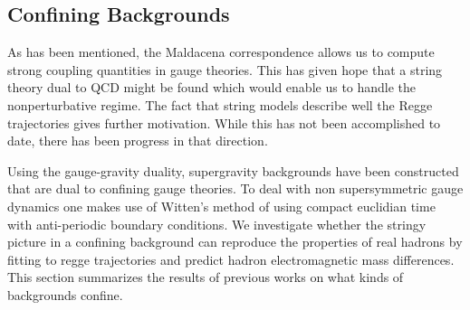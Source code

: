 \documentclass[11pt,a4paper]{article}
\begin{document}
\FloatBarrier
\subsection{Confining Backgrounds}
As has been mentioned, the Maldacena correspondence allows us to compute strong coupling quantities in gauge theories. This has given hope that a string theory dual to QCD might be found which would enable us to handle the nonperturbative regime. The fact that string models describe well the Regge trajectories gives further motivation. While this has not been accomplished to date, there has been progress in that direction.

Using the gauge-gravity duality, supergravity backgrounds have been constructed that are dual to confining gauge theories. To deal with non supersymmetric gauge dynamics one makes use of Witten's method \cite{Witten98,Kuperstein04} of  using compact euclidian time with anti-periodic boundary conditions. We investigate whether the stringy picture in a confining background can reproduce the properties of real hadrons by fitting to regge trajectories and predict hadron electromagnetic mass differences. This section summarizes the results of previous works on what kinds of backgrounds confine.  

\FloatBarrier
\end{document}
